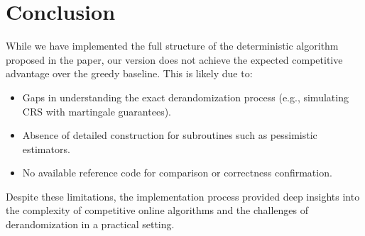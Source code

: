 \documentclass[11pt]{article}
\begin{document}
\section{Conclusion}

While we have implemented the full structure of the deterministic algorithm proposed in the paper, our version does not achieve the expected competitive advantage over the greedy baseline. This is likely due to:
\begin{itemize}
  \item Gaps in understanding the exact derandomization process (e.g., simulating CRS with martingale guarantees).
  \item Absence of detailed construction for subroutines such as pessimistic estimators.
  \item No available reference code for comparison or correctness confirmation.
\end{itemize}

Despite these limitations, the implementation process provided deep insights into the complexity of competitive online algorithms and the challenges of derandomization in a practical setting.
\end{document}
